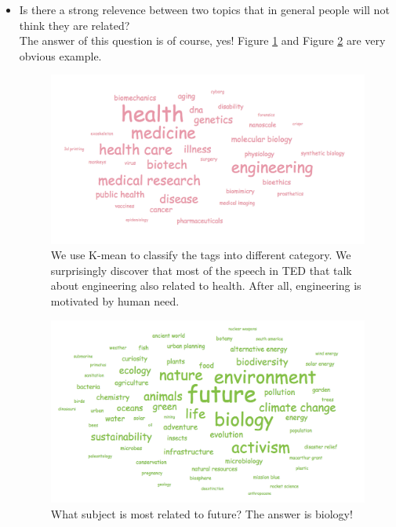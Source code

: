\documentclass{report}
\numberwithin{figure}{section}
\begin{document}
\begin{itemize}
\item
Is there a strong relevence between two topics that in general people will not think they are related?
\\
\quad The answer of this question is of course, yes! Figure \ref{fig:healthengineering} and Figure \ref{fig:futurebiology} are very obvious example.


\begin{figure}
\begin{center}
\includegraphics[scale=0.5]{healthengineering}
\caption{We use K-mean to classify the tags into different category. We surprisingly discover that most of the speech in TED that talk about engineering also related to health. After all, engineering is motivated by human need.}
\label{fig:healthengineering}
\end{center}
\end{figure} 

\begin{figure}
\begin{center}
\includegraphics[scale=0.5]{futurebiology}
\caption{What subject is most related to future? The answer is biology!}
\label{fig:futurebiology}
\end{center}
\end{figure} 


\end{itemize}
\end{document}
